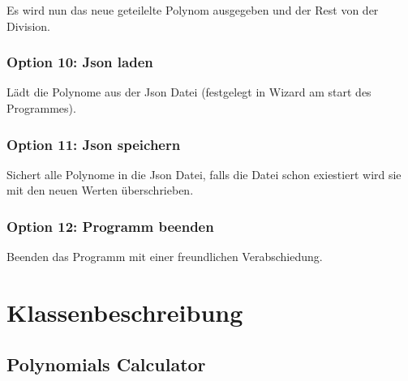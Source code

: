 \documentclass[letterpaper,10pt,ngerman]{sphinxmanual}
\begin{document}
Es wird nun das neue geteilelte Polynom ausgegeben und der Rest von der Division.



\subsection{Option 10: Json laden}
\label{menu:option-10-json-laden}
Lädt die Polynome aus der Json Datei (festgelegt in Wizard am start des Programmes).



\subsection{Option 11: Json speichern}
\label{menu:option-11-json-speichern}
Sichert alle Polynome in die Json Datei, falls die Datei schon exiestiert wird sie mit den neuen Werten überschrieben.



\subsection{Option 12: Programm beenden}
\label{menu:option-12-programm-beenden}
Beenden das Programm mit einer freundlichen Verabschiedung.



\chapter{Klassenbeschreibung}
\label{index:klassenbeschreibung}

\section{Polynomials Calculator}
\label{packages::doc}\label{packages:polynomials-calculator}
\end{document}
